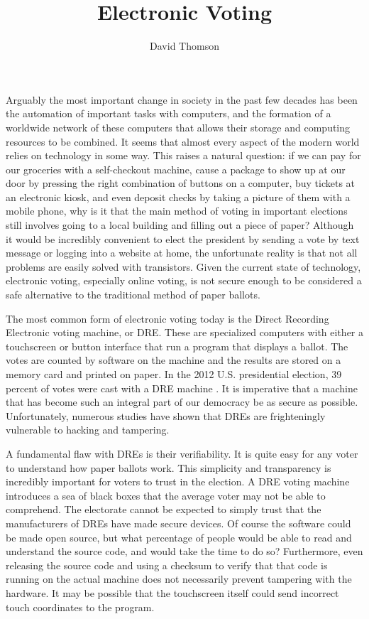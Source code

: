 \documentclass[12pt, titlepage]{article}
\begin{document}
\title{Electronic Voting}
\author{David Thomson}
\maketitle

Arguably the most important change in society in the past few decades has been the automation of important tasks with computers, and the formation of a worldwide network of these computers that allows their storage and computing resources to be combined. It seems that almost every aspect of the modern world relies on technology in some way. This raises a natural question: if we can pay for our groceries with a self-checkout machine, cause a package to show up at our door by pressing the right combination of buttons on a computer, buy tickets at an electronic kiosk, and even deposit checks by taking a picture of them with a mobile phone, why is it that the main method of voting in important elections still involves going to a local building and filling out a piece of paper? Although it would be incredibly convenient to elect the president by sending a vote by text message or logging into a website at home, the unfortunate reality is that not all problems are easily solved with transistors. Given the current state of technology, electronic voting, especially online voting, is not secure enough to be considered a safe alternative to the traditional method of paper ballots.

The most common form of electronic voting today is the Direct Recording Electronic voting machine, or DRE. These are specialized computers with either a touchscreen or button interface that run a program that displays a ballot. The votes are counted by software on the machine and the results are stored on a memory card and printed on paper. In the 2012 U.S. presidential election, 39 percent of votes were cast with a DRE machine \cite{kalb2015guide}. It is imperative that a machine that has become such an integral part of our democracy be as secure as possible. Unfortunately, numerous studies have shown that DREs are frighteningly vulnerable to hacking and tampering.

A fundamental flaw with DREs is their verifiability. It is quite easy for any voter to understand how paper ballots work. This simplicity and transparency is incredibly important for voters to trust in the election. A DRE voting machine introduces a sea of black boxes that the average voter may not be able to comprehend. The electorate cannot be expected to simply trust that the manufacturers of DREs have made secure devices. Of course the software could be made open source, but what percentage of people would be able to read and understand the source code, and would take the time to do so? Furthermore, even releasing the source code and using a checksum to verify that that code is running on the actual machine does not necessarily prevent tampering with the hardware. It may be possible that the touchscreen itself could send incorrect touch coordinates to the program.
\end{document}
